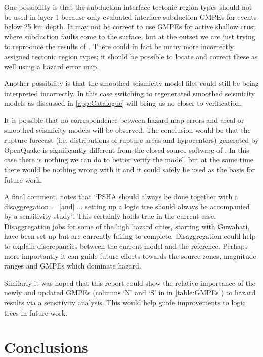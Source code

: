 \documentclass{article}
\begin{document}
One possibility is that the subduction interface tectonic region types should not be used in layer 1 because \cite{nath2011peak} only evaluated interface subduction GMPEs for events below 25 km depth. 
It may not be correct to use GMPEs for active shallow crust where subduction faults come to the surface, but at the outset we are just trying to reproduce the results of \cite{nath2012probabilistic}. 
There could in fact be many more incorrectly assigned tectonic region types; it should be possible to locate and correct these as well using a hazard error map.

Another possibility is that the smoothed seismicity model files could still be being interpreted incorrectly.
In this case switching to regenerated smoothed seismicity models as discussed in \autoref{app:Catalogue} will bring us no closer to verification.

It is possible that no correspondence between hazard map errors and areal or smoothed seismicity models will be observed. 
The conclusion would be that the rupture forecast (i.e. distributions of rupture areas and hypocenters) generated by OpenQuake is significantly different from the closed-source software of \cite{nath2012probabilistic}.
In this case there is nothing we can do to better verify the model, but at the same time there would be nothing wrong with it and it could safely be used as the basis for future work.

A final comment.
\cite{bommer2008use} notes that ``PSHA should always be done together with a disaggregation ... [and] ... setting up a logic tree should always be accompanied by a sensitivity study''. 
This certainly holds true in the current case. Disaggregation jobs for some of the high hazard cities, starting with Guwahati, have been set up but are currently failing to complete.
Disaggregation could help to explain discrepancies between  the current model and the reference.
Perhaps more importantly it can guide future efforts towards the source zones, magnitude ranges and GMPEs which dominate hazard.

Similarly it was hoped that this report could show the relative importance of the newly and updated GMPEs (columns `N' and `S' in in \autoref{table:GMPEs}) to hazard results via a sensitivity analysis.
This would help guide improvements to logic trees in future work.

\section{Conclusions}
\label{sec:Conclusions}
\end{document}
